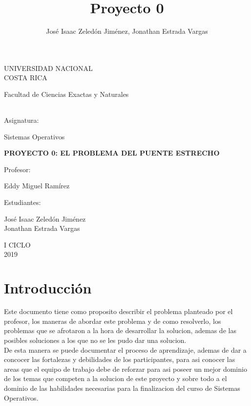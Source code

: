 \documentclass[10pt,a4paper]{article}
\author{José Isaac Zeledón Jiménez, Jonathan Estrada Vargas}
\title{Proyecto 0}
\begin{document}
\begin{titlepage}
\begin{center}
\begin{large}
UNIVERSIDAD NACIONAL\\
COSTA RICA \\
\end{large}
\vspace*{1cm}
\begin{large}
Facultad de Ciencias Exactas y Naturales
\end{large} 
\vspace*{1.8cm}\\
Asignatura:\\
\vspace*{2mm}
\begin{large}
Sistemas Operativos\\
\end{large}
\vspace*{12mm}
\begin{large}
\textbf{PROYECTO 0: 
EL PROBLEMA DEL PUENTE ESTRECHO
}\\
\end{large}
\vspace*{1.8cm}
Profesor:\\
\vspace*{5mm}
\begin{large}
Eddy Miguel Ramírez\\
\end{large}
\vspace*{1.8cm}
Estudiantes: \\
\vspace*{5mm}
\begin{large}
José Isaac Zeledón Jiménez\\
Jonathan Estrada Vargas\\
\end{large}
\vspace*{1.8cm}
I CICLO\\
\vspace*{1.8cm}
2019
\end{center}
\end{titlepage}
\tableofcontents
\pagebreak
\section{Introducción}
	Este documento tiene como proposito describir el problema planteado por el profesor, los maneras de abordar este problema y de como resolverlo, los problemas que se afrotaron a la hora de desarrollar la solucion, ademas de las posibles soluciones a los que no se les pudo dar una solucion.\\
De esta manera se puede documentar el proceso de aprendizaje, ademas de dar a concocer las fortalezas y debilidades de los participantes, para asi conocer las areas que el equipo de trabajo debe de reforzar para asi poseer un mejor dominio de los temas que competen a la solucion de este proyecto y sobre todo a el dominio de las habilidades necesarias para la finalizacion del curso de Sistemas Operativos.\\
\end{document}
